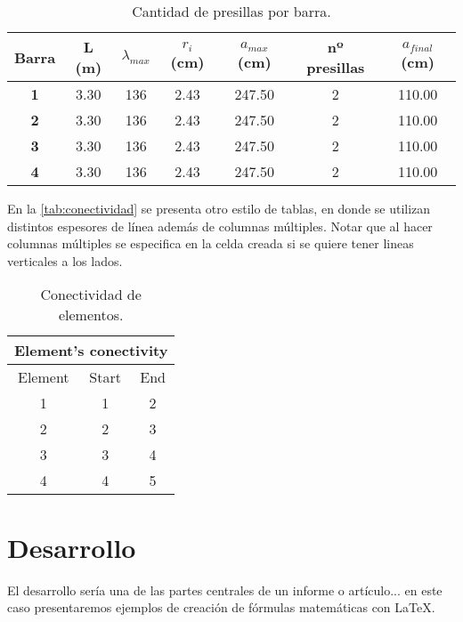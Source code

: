 \documentclass[a4paper,11pt]{article}
\begin{document}
\begin{table}[h]
	\centering
	\caption{Cantidad de presillas por barra.}  
	\begin{tabular}{ccccccc}
		\textbf{Barra} & \textbf{L (m)} & \boldmath$\lambda_{max}$ & \boldmath$r_i$ \textbf{(cm)} & \boldmath$a_{max}$ \textbf{(cm)} & \textbf{nº presillas} & \boldmath$a_{final}$ \textbf{(cm)} \\
		\hline
		\hline
		\textbf{1} & 3.30  & 136   & 2.43  & 247.50 & 2     & 110.00 \\    \hline
		\textbf{2} & 3.30  & 136   & 2.43  & 247.50 & 2     & 110.00 \\    \hline
		\textbf{3} & 3.30  & 136   & 2.43  & 247.50 & 2     & 110.00 \\    \hline
		\textbf{4} & 3.30  & 136   & 2.43  & 247.50 & 2     & 110.00 \\    \hline
	\end{tabular}%
	\label{tab:presillas1}%
\end{table}%

En la \autoref{tab:conectividad} se presenta otro estilo de tablas, en donde se utilizan distintos espesores de línea además de columnas múltiples. Notar que al hacer columnas múltiples se especifica en la celda creada si se quiere tener lineas verticales a los lados.

\begin{table}[h]
	\centering
	\caption{Conectividad de elementos.} 
	\begin{tabular}{|c|c|c|}
		\toprule[0.8mm]                                                                 
		\multicolumn{3}{|c|}{Element's conectivity    }  \\  
		\midrule[0.5mm]                                  
		Element & Start & End \\ \midrule[0.5mm]                                                                                                                                                     
		1 &    1 &    2 \\
		2 &    2 &    3 \\
		3 &    3 &    4 \\
		4 &    4 &    5 \\
		\bottomrule[0.8mm]                                        
	\end{tabular}%
	\label{tab:conectividad}%
\end{table}%



\section{Desarrollo}
%
El desarrollo sería una de las partes centrales de un informe o artículo... en este caso presentaremos ejemplos de creación de fórmulas matemáticas con \LaTeX.
\end{document}

